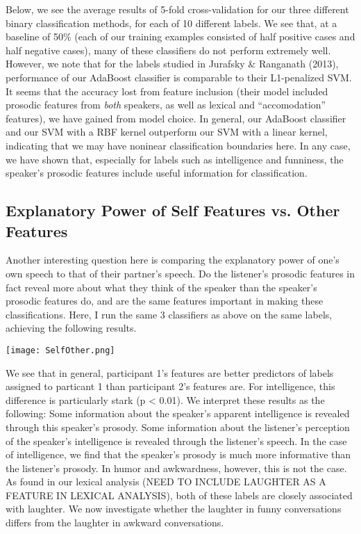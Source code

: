\documentclass[11pt]{article}
\begin{document}
Below, we see the average results of 5-fold cross-validation for our three different binary classification methods, for each of 10 different labels.  We see that, at a baseline of 50\% (each of our training examples consisted of half positive cases and half negative cases), many of these classifiers do not perform extremely well.  However, we note that for the labels studied in Jurafsky \& Ranganath (2013), performance of our AdaBoost classifier is comparable to their L1-penalized SVM.  It seems that the accuracy lost from feature inclusion (their model included prosodic features from \emph{both} speakers, as well as lexical and ``accomodation'' features), we have gained from model choice.  In general, our AdaBoost classifier and our SVM with a RBF kernel outperform our SVM with a linear kernel, indicating that we may have noninear classification boundaries here.  In any case, we have shown that, especially for labels such as intelligence and funniness, the speaker's prosodic features include useful information for classification.

\subsection{Explanatory Power of Self Features vs. Other Features}
Another interesting question here is comparing the explanatory power of one's own speech to that of their partner's speech.  Do the listener's prosodic features in fact reveal more about what they think of the speaker than the speaker's prosodic features do, and are the same features important in making these classifications.  Here, I run the same 3 classifiers as above on the same labels, achieving the following results. 

\begin{center}
\texttt{[image: SelfOther.png]} 
\end{center}
We see that in general, participant 1's features are better predictors of labels assigned to particant 1 than participant 2's features are.  For intelligence, this difference is particularly stark (p < 0.01).  We interpret these results as the following: Some information about the speaker's apparent intelligence is revealed through this speaker's prosody.  Some information about the listener's perception of the speaker's intelligence is revealed through the listener's speech.  In the case of intelligence, we find that the speaker's prosody is much more informative than the listener's prosody.  In humor and awkwardness, however, this is not the case.  As found in our lexical analysis (NEED TO INCLUDE LAUGHTER AS A FEATURE IN LEXICAL ANALYSIS), both of these labels are closely associated with laughter.  We now investigate whether the laughter in funny conversations differs from the laughter in awkward conversations.


\end{document}
